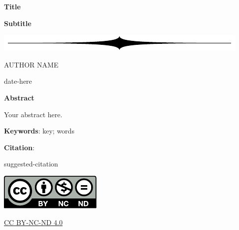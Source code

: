 \documentclass[12pt]{extarticle}
\begin{document}
\thispagestyle{empty}


\bigskip

{\selectfont
\color{Mahogany}
\centerline{\huge{\textbf{Title}}} 
\bigskip
\centerline{\Large{\textbf{Subtitle}}}
}

\bigskip
\bigskip

\centerline{\includegraphics[scale=0.25]{divider}}

\bigskip
\bigskip

\centerline{ \large AUTHOR NAME\footnotemark}

\bigskip

\centerline{ date-here }


\bigskip
\bigskip

\noindent \textbf{Abstract}

Your abstract here.

\bigskip

\textbf{Keywords}: key; words

\bigskip

\textbf{Citation}:

suggested-citation

\bigskip
\bigskip

\begin{centering}
	
\vfill

\includegraphics[scale=0.5]{by-nc-nd} \vspace{-0.8em}

\footnotesize
\href{commons-link}{CC BY-NC-ND 4.0}

\vfill

\end{centering}
\end{document}

